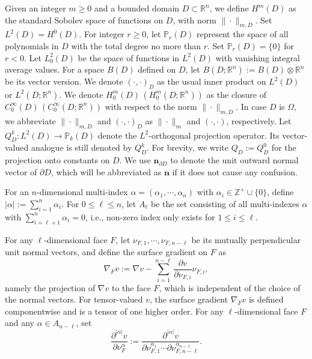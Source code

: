 \documentclass[10pt]{amsart}
\numberwithin{equation}{section}
\begin{document}
Given an integer $m \geq 0$ and a bounded domain $D \subset \mathbb{R}^{n}$,
we define $H^{m}(D)$ as the standard Sobolev space of functions on $D$,
with norm $\|\cdot\|_{m,D}$. Set $L^{2}(D)=H^{0}(D)$.
For integer $r\geq0$,
let $\mathbb{P}_{r}(D)$ represent the space of all polynomials in $D$ with the total degree no more than $r$.
Set $\mathbb{P}_{r}(D)=\{0\}$ for $r<0$.
Let $L_{0}^{2}(D)$ be the space of functions in $L^{2}(D)$ with vanishing integral average values. For a space $B(D)$ defined on $D$,
let $B(D; \mathbb{R}^n):=B(D) \otimes \mathbb{R}^n$ be its vector version.
We denote $(\cdot, \cdot)_{D}$
as the usual inner product on $L^{2}(D)$ or $L^{2}(D; \mathbb{R}^n)$. We denote $H_{0}^{m}(D)\,(H_{0}^{m}(D; \mathbb{R}^n))$ as the closure of $C_{0}^{\infty}(D)\,(C_{0}^{\infty}(D; \mathbb{R}^n))$
with respect to the norm $\| \cdot \|_{m,D}$.  
In case $D$ is $\Omega$, we abbreviate $\|\cdot\|_{m,D}$ and
$(\cdot,\cdot)_D$ as $\|\cdot\|_m$ and $(\cdot,\cdot)$, respectively. Let $Q_D^k: L^{2}(D) \to \mathbb{P}_{k}(D)$ denote the $L^2$-orthogonal projection operator.
Its vector-valued analogue is still denoted by $Q_D^k$. For brevity, we write $Q_D := Q_D^0$ for the projection onto constants on $D$.
We use $\boldsymbol{n}_{\partial D}$ to denote the unit outward normal vector of $\partial D$, which will be abbreviated as $\boldsymbol{n}$ if it does not cause any confusion.

For an $n$-dimensional multi-index $\alpha = (\alpha_1, \cdots , \alpha_n)$ with $\alpha_i\in\mathbb Z^+\cup\{0\}$, define $|\alpha|:=\sum_{i=1}^n\alpha_i$.
For $0\leq \ell \leq n$, let $A_{\ell}$ be the set consisting of all multi-indexes $\alpha$ with $\sum_{i=\ell+1}^n\alpha_i=0$, i.e., non-zero index only exists for $1\leq i\leq\ell$.

For any $\ell$-dimensional face $F$, let $\nu_{F,1}, \cdots, \nu_{F,n-\ell}$ be its
mutually perpendicular unit normal vectors, and define the surface gradient on $F$ as
\begin{equation}\label{eq:surfacegrad}
\nabla_{F}v:=\nabla v-\sum_{i=1}^{n-\ell}\frac{\partial v}{\partial\nu_{F,i}}\nu_{F,i},
\end{equation}
namely the projection of $\nabla v$ to the face $F$, which is independent of the choice of the normal vectors.
For tensor-valued $v$, the surface gradient $\nabla_{F}v$ is defined
componentwise and is a tensor of one higher order.
For any $\ell$-dimensional face $F$ and any $\alpha\in A_{n-\ell}$, set
\[
\frac{\partial^{|\alpha|}v}{\partial\nu_{F}^{\alpha}}:=\frac{\partial^{|\alpha|}v}{\partial\nu_{F, 1}^{\alpha_1}\cdots\partial\nu_{F, n-\ell}^{\alpha_{n-\ell}}}.
\]
\end{document}
